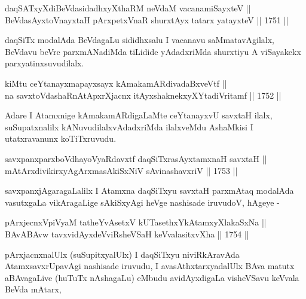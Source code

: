 \begin{shl}
daqSATxyXdiBeVdasidadhxyXthaRM neVdaM vacanamiSayxteV ||  \\
BeVdasAyxtoV\s nayxtaH pArxpetxVnaR shurxtAyx tatarx yatayxteV \hfill || 1751 ||  
\end{shl}

\begin{artha}
daqSiTx modalAda BeVdagaLu sididhxsalu I vacanavu saMmatavAgilalx,
BeVdavu beVre parxmANadiMda tiLidide yAdadxriMda shurxtiyu A
viSayakekx parxyatinxsuvudilalx.
\end{artha}

\begin{shl}
kiMtu ceYtanayxmapayxsayx kAmakamARdivadaBxveVtf || \\
na savxtoV\s dashaRnAtApxrXjacnx itAyxshaknekxyXYtadiVritamf \hfill || 1752 ||  
\end{shl}

\begin{artha}
Adare I Atamxnige kAmakamARdigaLaMte ceYtanayxvU savxtaH ilalx,
suSupatxnalilx kANuvudilalxvAdadxriMda ilalxveMdu AshaMkisi I
utatxravanunx koTiTxruvudu.
\end{artha}


\begin{shl}
savxpanxparxboVdhayoVyaRdavxtf daqSiTxrasAyx\s \s tamxnaH savxtaH || \\
mAtArxdivikirxyAgArxmasAkiSxNiV sA\s vinashavxriV \hfill || 1753 ||  
\end{shl}

\begin{artha}
savxpanxjAgaragaLalilx I Atamxna daqSiTxyu savxtaH parxmAtaq modalAda
vasutxgaLa vikAragaLige sAkiSxyAgi heVge nashisade iruvudoV, hAgeye -
\end{artha}

\begin{shl}
pArxjecnxV\s piVyaM tatheYvA\s \s setxV kUTasethxYkAtamxyXlakaSxNa ||  \\
BAvABAvw tavxvidAyxdeVviRsheVSaH keVvalasitxvXha \hfill || 1754 ||  
\end{shl}

\begin{artha}
pArxjacnxnalUlx (suSupitxyalUlx) I daqSiTxyu niviRkAravAda
AtamxsavxrUpavAgi nashisade iruvudu, I avasAthxtarxyadalUlx BAva
matutx aBAvagaLive (huTuTx nAshagaLu) eMbudu avidAyxdigaLa visheVSavu
keVvala BeVda mAtarx,
\end{artha}

